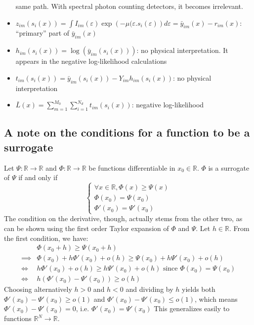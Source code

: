 \documentclass[a4paper, 10pt]{article}
\begin{document}
\begin{itemize}
 same path. With spectral photon counting detectors, it becomes irrelevant.
 \item $z_{im}(s_i(x)) = \int I_{im}(\varepsilon) \exp \left( -\mu(\varepsilon.s_i(\varepsilon)\right) d\varepsilon = \bar{y}_{im}(x) - r_{im}(x)$: ``primary'' part of $\bar{y}_{im}(x)$
 \item $h_{im}(s_i(x)) = \log\left(\bar{y}_{im}(s_i(x))\right) $: no physical interpretation. It appears in the negative log-likelihood calculations
 \item $t_{im}(s_i(x)) = \bar{y}_{im}(s_i(x)) - Y_{im}h_{im}(s_i(x))$: no physical interpretation
 \item $\bar{L}(x) = \sum_{m=1}^{M_0} \sum_{i=1}^{N_d} t_{im}(s_i(x))$: negative log-likelihood 
\end{itemize}

\subsection{A note on the conditions for a function to be a surrogate}

Let $\Psi: \mathbb{R} \to \mathbb{R}$ and $\Phi : \mathbb{R} \to \mathbb{R}$ be functions differentiable in $x_0 \in \mathbb{R}$.
$\Phi$ is a surrogate of $\Psi$ if and only if
\begin{equation}
  \left\{
  \begin{array}{lll}
    \forall x \in \mathbb{R}, \Phi(x) \geq \Psi(x)\\
    \Phi(x_0) = \Psi(x_0) \\
    \Phi'(x_0) = \Psi'(x_0)
  \end{array}
  \right.
\end{equation}
The condition on the derivative, though, actually stems from the other two, as can be shown using the first order Taylor expansion of $\Phi$ and $\Psi$.
Let $h \in \mathbb{R}$. From the first condition, we have:
\begin{equation}
\begin{split}
  & \Phi(x_0 + h) \geq \Psi(x_0 + h) \\
  \implies & \Phi(x_0) + h \Phi'(x_0) + o(h) \geq \Psi(x_0) + h \Psi'(x_0) + o(h) \\
  \iff & h \Phi'(x_0) + o(h) \geq h \Psi'(x_0) + o(h) \text{ since } \Phi(x_0) = \Psi(x_0) \\
  \iff & h \left( \Phi'(x_0) - \Psi'(x_0) \right) \geq o(h)
  \end{split}
\end{equation}
Choosing alternatively $h > 0$ and $h < 0$ and dividing by $h$ yields both $\Phi'(x_0) - \Psi'(x_0) \geq o(1)$ and 
$\Phi'(x_0) - \Psi'(x_0) \leq o(1)$, which means $\Phi'(x_0) - \Psi'(x_0)= 0$, i.e. $\Phi'(x_0) = \Psi'(x_0)$
This generalizes easily to functions $\mathbb{R}^N \to \mathbb{R}$. 
\end{document}
